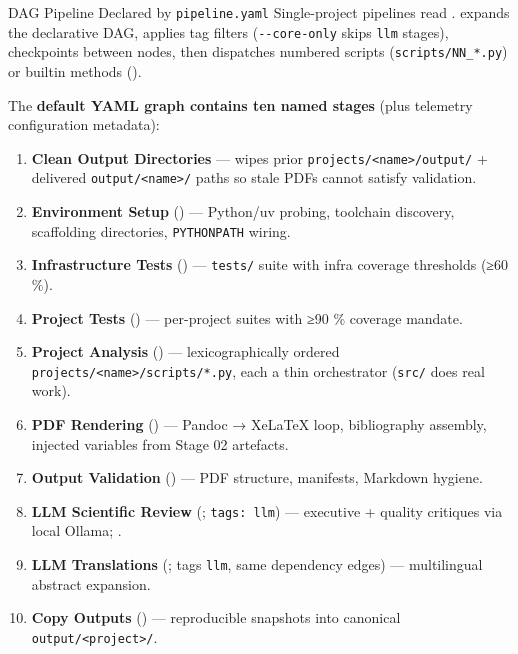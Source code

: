 \documentclass[
  ignorenonframetext,
]{beamer}
\author{\texorpdfstring{}{}}
\date{}
\providecommand{\tightlist}{%
  \setlength{\itemsep}{0pt}\setlength{\parskip}{0pt}}
\begin{document}
\begin{frame}{DAG Pipeline Declared by
\texttt{pipeline.yaml}}
\protect{}\label{dag-pipeline-declared-by-pipeline.yaml}
Single-project pipelines read
.
 expands the declarative DAG,
applies tag filters (\texttt{-\/-core-only} skips \texttt{llm} stages),
checkpoints between nodes, then dispatches numbered scripts
(\texttt{scripts/NN\_*.py}) or builtin methods
().

The \textbf{default YAML graph contains ten named stages} (plus
telemetry configuration metadata):

\begin{enumerate}
\tightlist
\item
  \textbf{Clean Output Directories} --- wipes prior
  \texttt{projects/\textless{}name\textgreater{}/output/} + delivered
  \texttt{output/\textless{}name\textgreater{}/} paths so stale PDFs
  cannot satisfy validation.
\item
  \textbf{Environment Setup} () ---
  Python/uv probing, toolchain discovery, scaffolding directories,
  \texttt{PYTHONPATH} wiring.
\item
  \textbf{Infrastructure Tests}
  () --- \texttt{tests/} suite
  with infra coverage thresholds (≥60 \%).
\item
  \textbf{Project Tests} ()
  --- per-project suites with ≥90 \% coverage mandate.
\item
  \textbf{Project Analysis} () ---
  lexicographically ordered
  \texttt{projects/\textless{}name\textgreater{}/scripts/*.py}, each a
  thin orchestrator (\texttt{src/} does real work).
\item
  \textbf{PDF Rendering} () --- Pandoc →
  XeLaTeX loop, bibliography assembly, injected variables from Stage 02
  artefacts.
\item
  \textbf{Output Validation} () --- PDF
  structure, manifests, Markdown hygiene.
\item
  \textbf{LLM Scientific Review}
  (; \texttt{tags:\ llm})
  --- executive + quality critiques via local Ollama;
  .
\item
  \textbf{LLM Translations}
  (; tags
  \texttt{llm}, same dependency edges) --- multilingual abstract
  expansion.
\item
  \textbf{Copy Outputs} () --- reproducible
  snapshots into canonical
  \texttt{output/\textless{}project\textgreater{}/}.
\end{enumerate}


\end{frame}
\end{document}
